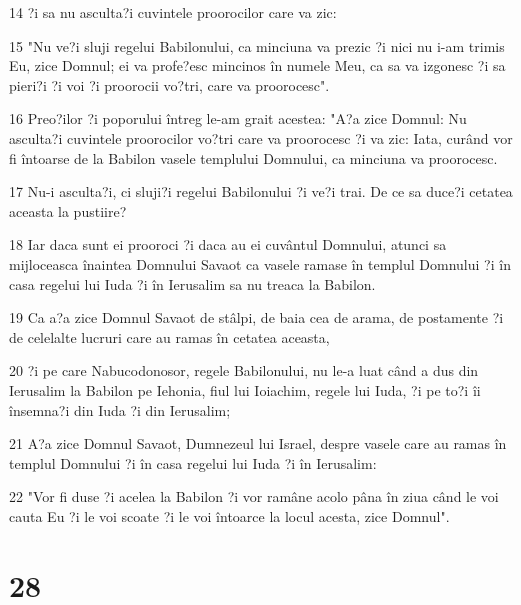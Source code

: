 \par 14 ?i sa nu asculta?i cuvintele proorocilor care va zic:
\par 15 "Nu ve?i sluji regelui Babilonului, ca minciuna va prezic ?i nici nu i-am trimis Eu, zice Domnul; ei va profe?esc mincinos în numele Meu, ca sa va izgonesc ?i sa pieri?i ?i voi ?i proorocii vo?tri, care va proorocesc".
\par 16 Preo?ilor ?i poporului întreg le-am grait acestea: "A?a zice Domnul: Nu asculta?i cuvintele proorocilor vo?tri care va proorocesc ?i va zic: Iata, curând vor fi întoarse de la Babilon vasele templului Domnului, ca minciuna va proorocesc.
\par 17 Nu-i asculta?i, ci sluji?i regelui Babilonului ?i ve?i trai. De ce sa duce?i cetatea aceasta la pustiire?
\par 18 Iar daca sunt ei prooroci ?i daca au ei cuvântul Domnului, atunci sa mijloceasca înaintea Domnului Savaot ca vasele ramase în templul Domnului ?i în casa regelui lui Iuda ?i în Ierusalim sa nu treaca la Babilon.
\par 19 Ca a?a zice Domnul Savaot de stâlpi, de baia cea de arama, de postamente ?i de celelalte lucruri care au ramas în cetatea aceasta,
\par 20 ?i pe care Nabucodonosor, regele Babilonului, nu le-a luat când a dus din Ierusalim la Babilon pe Iehonia, fiul lui Ioiachim, regele lui Iuda, ?i pe to?i îi însemna?i din Iuda ?i din Ierusalim;
\par 21 A?a zice Domnul Savaot, Dumnezeul lui Israel, despre vasele care au ramas în templul Domnului ?i în casa regelui lui Iuda ?i în Ierusalim:
\par 22 "Vor fi duse ?i acelea la Babilon ?i vor ramâne acolo pâna în ziua când le voi cauta Eu ?i le voi scoate ?i le voi întoarce la locul acesta, zice Domnul".

\chapter{28}


